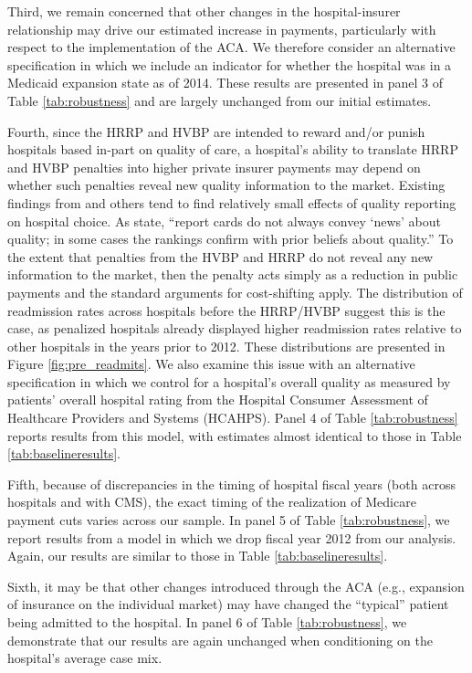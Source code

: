 \documentclass[12pt]{article}
\begin{document}
Third, we remain concerned that other changes in the hospital-insurer relationship may drive our estimated increase in payments, particularly with respect to the implementation of the ACA. We therefore consider an alternative specification in which we include an indicator for whether the hospital was in a Medicaid expansion state as of 2014. These results are presented in panel 3 of Table \ref{tab:robustness} and are largely unchanged from our initial estimates.

Fourth, since the HRRP and HVBP are intended to reward and/or punish hospitals based in-part on quality of care, a hospital's ability to translate HRRP and HVBP penalties into higher private insurer payments may depend on whether such penalties reveal new quality information to the market. Existing findings from \cite{dranove2008} and others tend to find relatively small effects of quality reporting on hospital choice. As \cite{dranove2008} state, ``report cards do not always convey `news' about quality; in some cases the rankings confirm with prior beliefs about quality.'' To the extent that penalties from the HVBP and HRRP do not reveal any new information to the market, then the penalty acts simply as a reduction in public payments and the standard arguments for cost-shifting apply. The distribution of readmission rates across hospitals before the HRRP/HVBP suggest this is the case, as penalized hospitals already displayed higher readmission rates relative to other hospitals in the years prior to 2012. These distributions are presented in Figure \ref{fig:pre_readmits}. We also examine this issue with an alternative specification in which we control for a hospital's overall quality as measured by patients' overall hospital rating from the Hospital Consumer Assessment of Healthcare Providers and Systems (HCAHPS).  Panel 4 of Table \ref{tab:robustness} reports results from this model, with estimates almost identical to those in Table \ref{tab:baselineresults}.

Fifth, because of discrepancies in the timing of hospital fiscal years (both across hospitals and with CMS), the exact timing of the realization of Medicare payment cuts varies across our sample. In panel 5 of Table \ref{tab:robustness}, we report results from a model in which we drop fiscal year 2012 from our analysis. Again, our results are similar to those in Table \ref{tab:baselineresults}.

Sixth, it may be that other changes introduced through the ACA (e.g., expansion of insurance on the individual market) may have changed the ``typical'' patient being admitted to the hospital. In panel 6 of Table \ref{tab:robustness}, we demonstrate that our results are again unchanged when conditioning on the hospital's average case mix.
\end{document}

